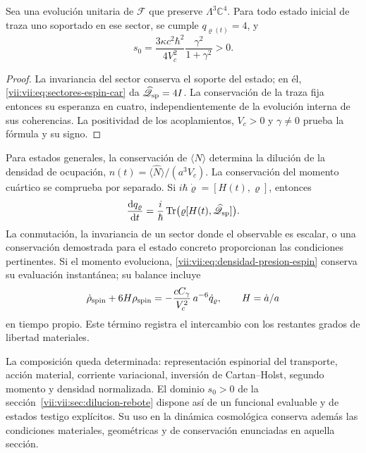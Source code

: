 \begin{corollary}
\label{vii:vii:cor:dominio-positivo-conservado}
Sea una evolución unitaria de \(\mathcal F\) que preserve
\(\Lambda^3\mathbb C^4\). Para todo estado inicial de traza uno
soportado en ese sector, se cumple \(q_{\varrho(t)}=4\), y
\begin{equation}
 s_0=\frac{3\kappa c^2\hbar^2}{4V_c^2}
                   \frac{\gamma^2}{1+\gamma^2}>0.
 \label{vii:vii:eq:amplitud-positiva-sector-tres}
\end{equation}
\end{corollary}
\begin{proof}
La invariancia del sector conserva el soporte del estado; en él,
\eqref{vii:vii:eq:sectores-espin-car} da
\(\widehat{\mathscr Q}_{\rm sp}=4I\). La conservación de la
traza fija entonces su esperanza en cuatro, independientemente de
la evolución interna de sus coherencias. La positividad de los
acoplamientos, \(V_c>0\) y \(\gamma\ne0\) prueba la fórmula
y su signo.
\end{proof}

Para estados generales, la conservación de
\(\langle\widehat N\rangle\) determina la dilución de la densidad
de ocupación, \(n(t)=\langle\widehat N\rangle/(a^3V_c)\).
La conservación del momento cuártico se comprueba por separado.
Si \(i\hbar\dot\varrho=[H(t),\varrho]\), entonces
\begin{equation}
 \frac{\mathrm d q_\varrho}{\mathrm dt}
 =\frac{i}{\hbar}\operatorname{Tr}
       \bigl(\varrho[H(t),\widehat{\mathscr Q}_{\rm sp}]\bigr).
 \label{vii:vii:eq:conservacion-momento-cuartico}
\end{equation}
La conmutación, la invariancia de un sector donde el observable es
escalar, o una conservación demostrada para el estado concreto
proporcionan las condiciones pertinentes. Si el momento evoluciona,
\eqref{vii:vii:eq:densidad-presion-espin} conserva su evaluación
instantánea; su balance incluye
\[
 \dot\rho_{\rm spin}+6H\rho_{\rm spin}
 =-\frac{cC_\gamma}{V_c^2}\,a^{-6}\dot q_\varrho,
 \qquad H=\dot a/a
\]
en tiempo propio. Este término registra el intercambio con los
restantes grados de libertad materiales.

La composición queda determinada: representación espinorial del
transporte, acción material, corriente variacional, inversión de
Cartan--Holst, segundo momento y densidad normalizada. El dominio
\(s_0>0\) de la sección~\ref{vii:vii:sec:dilucion-rebote} dispone así
de un funcional evaluable y de estados testigo explícitos. Su uso en
la dinámica cosmológica conserva además las condiciones materiales,
geométricas y de conservación enunciadas en aquella sección.
